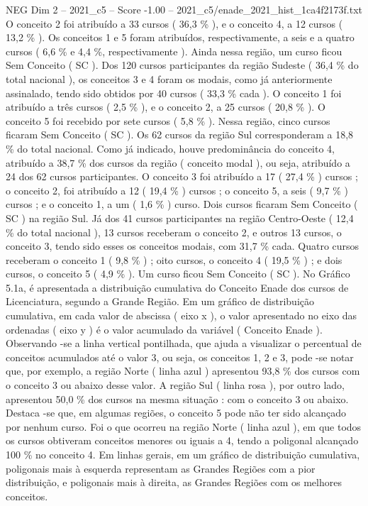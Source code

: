 \begin{textsample}{NEG Dim 2 – 2021\_c5 – Score -1.00 – 2021\_c5/enade\_2021\_hist\_1ca4f2173f.txt}
O conceito 2 foi atribuído a 33 cursos ( 36,3 \% ), e o conceito 4, a 12 cursos ( 13,2 \% ).
Os conceitos 1 e 5 foram atribuídos, respectivamente, a seis e a quatro cursos ( 6,6 \% e 4,4 \%, respectivamente ).
Ainda nessa região, um curso ficou Sem Conceito ( SC ).
Dos 120 cursos participantes da região Sudeste ( 36,4 \% do total nacional ), os conceitos 3 e 4 foram os modais, como já anteriormente assinalado, tendo sido obtidos por 40 cursos ( 33,3 \% cada ).
O conceito 1 foi atribuído a três cursos ( 2,5 \% ), e o conceito 2, a 25 cursos ( 20,8 \% ).
O conceito 5 foi recebido por sete cursos ( 5,8 \% ).
Nessa região, cinco cursos ficaram Sem Conceito ( SC ).
Os 62 cursos da região Sul corresponderam a 18,8 \% do total nacional.
Como já indicado, houve predominância do conceito 4, atribuído a 38,7 \% dos cursos da região ( conceito modal ), ou seja, atribuído a 24 dos 62 cursos participantes.
O conceito 3 foi atribuído a 17 ( 27,4 \% ) cursos ; o conceito 2, foi atribuído a 12 ( 19,4 \% ) cursos ; o conceito 5, a seis ( 9,7 \% ) cursos ; e o conceito 1, a um ( 1,6 \% ) curso.
Dois cursos ficaram Sem Conceito ( SC ) na região Sul.
Já dos 41 cursos participantes na região Centro-Oeste ( 12,4 \% do total nacional ), 13 cursos receberam o conceito 2, e outros 13 cursos, o conceito 3, tendo sido esses os conceitos modais, com 31,7 \% cada.
Quatro cursos receberam o conceito 1 ( 9,8 \% ) ; oito cursos, o conceito 4 ( 19,5 \% ) ; e dois cursos, o conceito 5 ( 4,9 \% ).
Um curso ficou Sem Conceito ( SC ).
No Gráfico 5.1a, é apresentada a distribuição cumulativa do Conceito Enade dos cursos de Licenciatura, segundo a Grande Região.
Em um gráfico de distribuição cumulativa, em cada valor de abscissa ( eixo x ), o valor apresentado no eixo das ordenadas ( eixo y ) é o valor acumulado da variável ( Conceito Enade ).
Observando -se a linha vertical pontilhada, que ajuda a visualizar o percentual de conceitos acumulados até o valor 3, ou seja, os conceitos 1, 2 e 3, pode -se notar que, por exemplo, a região Norte ( linha azul ) apresentou 93,8 \% dos cursos com o conceito 3 ou abaixo desse valor.
A região Sul ( linha rosa ), por outro lado, apresentou 50,0 \% dos cursos na mesma situação : com o conceito 3 ou abaixo.
Destaca -se que, em algumas regiões, o conceito 5 pode não ter sido alcançado por nenhum curso.
Foi o que ocorreu na região Norte ( linha azul ), em que todos os cursos obtiveram conceitos menores ou iguais a 4, tendo a poligonal alcançado 100 \% no conceito 4.
Em linhas gerais, em um gráfico de distribuição cumulativa, poligonais mais à esquerda representam as Grandes Regiões com a pior distribuição, e poligonais mais à direita, as Grandes Regiões com os melhores conceitos.

\end{textsample}
